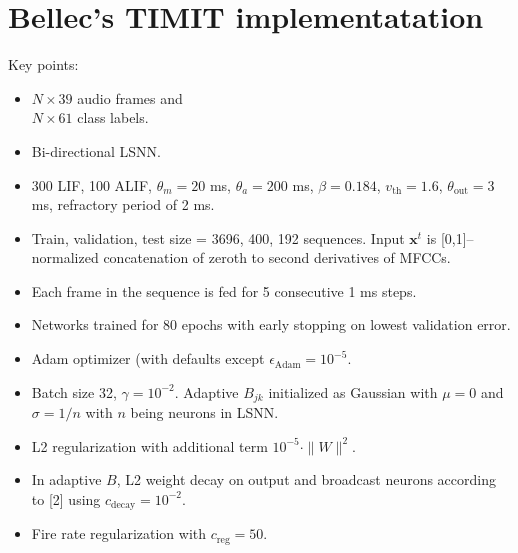 \documentclass{article}
\begin{document}
\section{Bellec's TIMIT implementatation}
Key points:
\begin{itemize}
\item $N\times39$ audio frames and \\
$N\times61$ class labels.
\item Bi-directional LSNN.
\item 300 LIF, 100 ALIF, $\theta_m = 20$ ms, $\theta_a = 200$ ms, $\beta = 0.184$, $v_\text{th} = 1.6$, $\theta_\text{out} = 3$ ms, refractory period of 2 ms.
\item Train, validation, test size = 3696, 400, 192 sequences. Input $\mathbf{x}^t$ is [0,1]--normalized concatenation of zeroth to second derivatives of MFCCs.
\item Each frame in the sequence is fed for 5 consecutive 1 ms steps.
\item Networks trained for 80 epochs with early stopping on lowest validation error.
\item Adam optimizer (with defaults except $\epsilon_\text{Adam} = 10^{-5}$.
\item Batch size 32, $\gamma = 10^{-2}$. Adaptive $B_{jk}$ initialized as Gaussian with $\mu = 0$ and $\sigma = 1/n$ with $n$ being neurons in LSNN.
\item L2 regularization with additional term $10^{-5} \cdot \|W\|^2$.
\item In adaptive $B$, L2 weight decay on output and broadcast neurons according to [2] using $c_\text{decay} = 10^{-2}$.
\item Fire rate regularization with $c_\text{reg} = 50$. 
\end{itemize}
\end{document}
